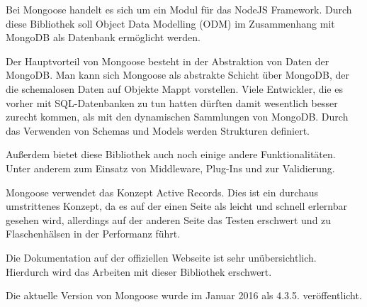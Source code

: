 Bei Mongoose handelt es sich um ein Modul für das NodeJS Framework.
Durch diese Bibliothek soll Object Data Modelling (ODM) im Zusammenhang mit MongoDB als Datenbank ermöglicht werden.

Der Hauptvorteil von Mongoose besteht in der Abstraktion von Daten der MongoDB.
Man kann sich Mongoose als abstrakte Schicht über MongoDB, der die schemalosen Daten auf Objekte Mappt vorstellen.
Viele Entwickler, die es vorher mit SQL-Datenbanken zu tun hatten dürften damit wesentlich besser zurecht kommen,
als mit den dynamischen Sammlungen von MongoDB. Durch das Verwenden von Schemas und Models werden Strukturen definiert.

Außerdem bietet diese Bibliothek auch noch einige andere Funktionalitäten. Unter anderem zum Einsatz von Middleware, Plug-Ins und zur Validierung.

Mongoose verwendet das Konzept Active Records. Dies ist ein durchaus umstrittenes Konzept,
da es auf der einen Seite als leicht und schnell erlernbar gesehen wird,
allerdings auf der anderen Seite das Testen erschwert und zu Flaschenhälsen in der Performanz führt. \cite{ormPattern:activeRecord}

Die Dokumentation auf der offiziellen Webseite ist sehr unübersichtlich. Hierdurch wird das Arbeiten mit dieser Bibliothek erschwert.

Die aktuelle Version von Mongoose wurde im Januar 2016 als 4.3.5. veröffentlicht.
